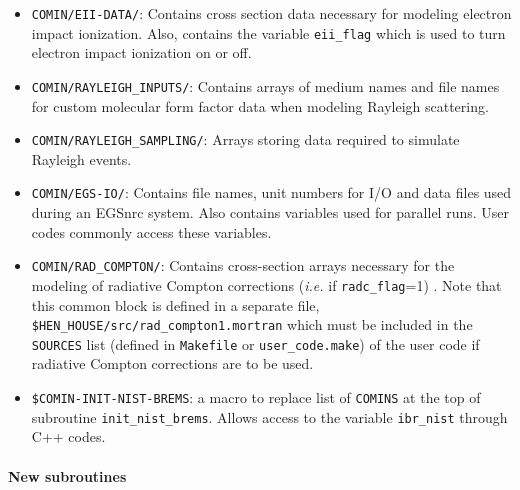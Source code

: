 \begin{itemize}
\item
{\tt COMIN/EII-DATA/}: Contains cross section
data necessary for modeling electron
impact ionization.  Also, contains the variable {\tt eii\_flag} which
is used to turn electron impact ionization on or off.

\item
{\tt COMIN/RAYLEIGH\_INPUTS/}: Contains arrays of medium names and
file names for custom molecular form factor data when modeling
Rayleigh scattering.

\item
{\tt COMIN/RAYLEIGH\_SAMPLING/}: Arrays storing data required to
simulate Rayleigh events.

\item
{\tt COMIN/EGS-IO/}: Contains file names, unit numbers for I/O and
data files used during an EGSnrc system.  Also contains variables used
for parallel runs.  User codes commonly access these variables.

\item
{\tt COMIN/RAD\_COMPTON/}: Contains cross-section arrays necessary for
the modeling of radiative Compton corrections
({\em i.e.} if {\tt radc\_flag}=1) .  Note that this common
block is defined in a separate file, {\tt \$HEN\_HOUSE/src/rad\_compton1.mortran} which must be included in the {\tt SOURCES} list
(defined in {\tt Makefile} or {\tt user\_code.make}) of the user code if
radiative Compton corrections are to be used.

\item
{\tt \$COMIN-INIT-NIST-BREMS}: a macro to replace list of {\tt COMINS}
at the top of subroutine {\tt init\_nist\_brems}.  Allows access to
the variable {\tt ibr\_nist} through C++ codes.

\end{itemize}

\paragraph{New subroutines}

